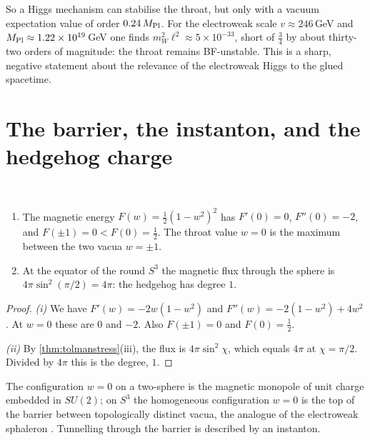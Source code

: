 So a Higgs mechanism can stabilise the throat, but only with a vacuum expectation value of order $0.24\,M_{\rm Pl}$. For the electroweak scale $v\approx246$\,GeV and $M_{\rm Pl}\approx1.22\times10^{19}$\,GeV one finds $m_W^2\ell^2\approx5\times10^{-33}$, short of $\frac34$ by about thirty-two orders of magnitude: the throat remains BF-unstable. This is a sharp, negative statement about the relevance of the electroweak Higgs to the glued spacetime.

\section{The barrier, the instanton, and the hedgehog charge}

\begin{proposition}\label{prop:barrier}\ver\
\begin{enumerate}[label=(\roman*)]
\item The magnetic energy $F(w)=\frac12(1-w^2)^2$ has $F'(0)=0$, $F''(0)=-2$, and $F(\pm1)=0<F(0)=\frac12$. The throat value $w=0$ is the maximum between the two vacua $w=\pm1$.
\item At the equator of the round $S^3$ the magnetic flux through the sphere is $4\pi\sin^2(\pi/2)=4\pi$: the hedgehog has degree $1$.
\end{enumerate}
\end{proposition}
\begin{proof}
\emph{(i)} We have $F'(w)=-2w(1-w^2)$ and $F''(w)=-2(1-w^2)+4w^2$. At $w=0$ these are $0$ and $-2$. Also $F(\pm1)=0$ and $F(0)=\frac12$.

\emph{(ii)} By \cref{thm:tolmanstress}(iii), the flux is $4\pi\sin^2\chi$, which equals $4\pi$ at $\chi=\pi/2$. Divided by $4\pi$ this is the degree, $1$.
\end{proof}


The configuration $w=0$ on a two-sphere is the magnetic monopole of unit charge embedded in $SU(2)$; on $S^3$ the homogeneous configuration $w=0$ is the top of the barrier between topologically distinct vacua, the analogue of the electroweak sphaleron \cite{KlinkhamerManton1984}. Tunnelling through the barrier is described by an instanton.

